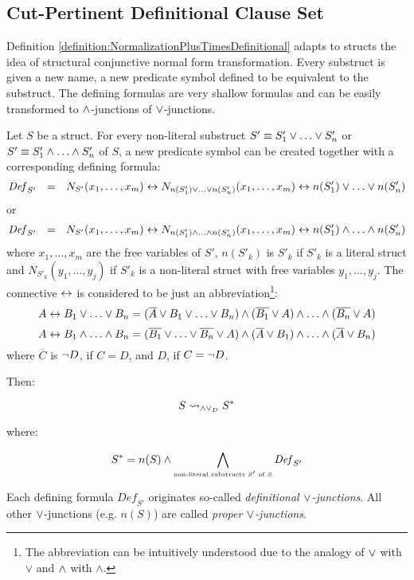 \subsection{Cut-Pertinent Definitional Clause Set}

Definition \ref{definition:NormalizationPlusTimesDefinitional} adapts to structs the idea of structural conjunctive normal form transformation. Every substruct is given a new name, a new predicate symbol defined to be equivalent to the substruct. The defining formulas are very shallow formulas and can be easily transformed to $\wedge$-junctions of $\vee$-junctions. 


\newcommand{\normalizePlusTimesD}{\leadsto_{\structplus\structtimes_{D}}}
\begin{definition}[$\normalizePlusTimesD$]
\label{definition:NormalizationPlusTimesDefinitional}

Let $S$ be a struct. For every non-literal substruct $S' \equiv S'_1 \vee \ldots \vee S'_n$ or $S' \equiv S'_1 \wedge \ldots \wedge S'_n$ of $S$, a new predicate symbol can be created together with a corresponding defining formula:
%
$$
\mathit{Def}_{S'} \ \ \defEq \ \  N_{S'}(x_1,\ldots, x_m) \biimp N_{n(S'_1) \structtimes \ldots \structtimes n(S'_n)}(x_1,\ldots, x_m) \biimp n(S'_1) \structtimes \ldots \structtimes n(S'_n)
$$
%
or 
%
$$
\mathit{Def}_{S'} \ \ \defEq \ \ N_{S'}(x_1,\ldots, x_m) \biimp N_{n(S'_1) \structplus \ldots \structplus n(S'_n)}(x_1,\ldots, x_m) \biimp n(S'_1) \structplus \ldots \structplus n(S'_n)
$$
%
where $x_1,\ldots, x_m$ are the free variables of $S'$, $n(S'_k)$ is $S'_k$ if $S'_k$ is a literal struct and $N_{S'_k}(y_1,\ldots, y_j)$ if $S'_k$ is a non-literal struct with free variables $y_1,\ldots, y_j$. The connective $\leftrightarrow$ is considered to be just an abbreviation\footnote{The abbreviation can be intuitively understood due to the analogy of $\vee$ with $\vee$ and $\wedge$ with $\wedge$.}:
$$
A \leftrightarrow B_1 \vee \ldots \vee B_n = 
(\overline{A} \vee B_1 \vee \ldots \vee B_n) \wedge 
(\overline{B_1} \vee A) \wedge \ldots \wedge 
(\overline{B_n} \vee A)
$$
$$
A \leftrightarrow B_1 \wedge \ldots \wedge B_n = 
(\overline{B_1} \vee \ldots \vee \overline{B_n} \vee A ) \wedge 
(\overline{A} \vee B_1) \wedge \ldots \wedge 
(\overline{A} \vee B_n)
$$
where $\overline{C}$ is $\neg D$, if $C = D$, and $D$, if $C = \neg D$.

Then:

$$
S \normalizePlusTimesD S^*
$$

where:

$$
S^* = n(S) \wedge \bigwedge_{\scriptscriptstyle \textrm{non-literal substructs } S'\textrm{ of }S } \mathit{Def}_{S'}
$$

Each defining formula $\mathit{Def}_{S'}$ originates so-called \emph{definitional $\vee$-junctions}. All other $\vee$-junctions (e.g. $n(S)$) are called \emph{proper $\vee$-junctions}.
\end{definition}


